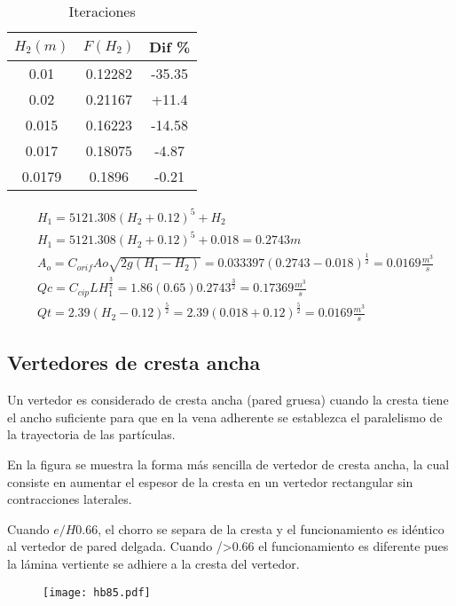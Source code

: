 \begin{table}[h!]
    \centering
    \begin{tabular}{@{}ccc@{}}
    \toprule
    $H_2(m)$ & $F(H_2)$ & Dif \% \\ \midrule
    0.01     & 0.12282  & -35.35 \\
    0.02     & 0.21167  & +11.4  \\
    0.015    & 0.16223  & -14.58 \\
    0.017    & 0.18075  & -4.87  \\
    0.0179   & 0.1896   & -0.21  \\ \bottomrule
    \end{tabular}
    \caption{Iteraciones}
    \label{tabhb7}
    \end{table}
\begin{align*}
    &H_1 = 5121.308\left(H_2 +0.12 \right)^5 + H_2\\
    &H_1 = 5121.308\left(H_2 +0.12 \right)^5 + 0.018 =0.2743m\\
    &A_o = C_{orif}Ao \sqrt{2g\left(H_1 - H_2\right)} = 0.033397\left(0.2743 - 0.018\right)^{\frac{1}{2}} =0.0169\frac{m^3}{s}\\
    &Qc =C_{cip}LH_1^{\frac{3}{2}} = 1.86(0.65)0.2743^{\frac{3}{2}} =0.17369 \frac{m^3}{s}\\
    &Qt = 2.39\left(H_2 -0. 12\right)^{\frac{5}{2}} = 2.39\left(0.018 + 0.12\right)^{\frac{5}{2}} =0.0169\frac{m^3}{s}
\end{align*}

\subsection{Vertedores de cresta ancha}

Un vertedor es considerado de cresta ancha (pared gruesa) cuando la cresta tiene el ancho suficiente para que en la vena adherente se establezca el paralelismo de la trayectoria de las partículas.

En la figura se muestra la forma más sencilla de vertedor de cresta ancha, la cual consiste en aumentar el espesor de la cresta en un vertedor rectangular sin contracciones laterales.

Cuando $e/H 0.66$, el chorro se separa de la cresta y el funcionamiento es idéntico al vertedor de pared delgada. Cuando />0.66 el funcionamiento es diferente pues la lámina vertiente se adhiere a la cresta del vertedor.

\begin{figure}[h!]
\centering
  \texttt{[image: hb85.pdf]}
  \caption{}
  \label{hb85}
\end{figure}

